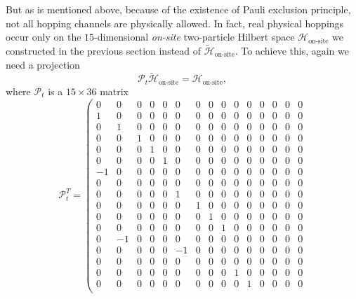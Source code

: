 \documentclass[10pt,nofootinbib]{revtex4}
\begin{document}
			\noindent But as is mentioned above, because of the existence of Pauli exclusion principle, not all hopping channels are physically allowed. In fact, real physical hoppings occur only on the $15$-dimensional \emph{on-site} two-particle Hilbert space $\mathcal{H}_{\text{on-site}}$ we constructed in the previous section instead of $\widetilde{\mathcal{H}}_{\text{on-site}}$. To achieve this, again we need a projection
			\begin{equation}\label{2.2.5}
				\mathcal{P}_t\widetilde{\mathcal{H}}_{\text{on-site}}=\mathcal{H}_{\text{on-site}},
			\end{equation}
			where $\mathcal{P}_t$ is a $15\times36$ matrix
			\begin{equation*}
				\mathcal{P}_t^T=\left(
				\begin{array}{ccccccccccccccc}
					0 & 0 & 0 & 0 & 0 & 0 & 0 & 0 & 0 & 0 & 0 & 0 & 0 & 0 & 0 \\
					1 & 0 & 0 & 0 & 0 & 0 & 0 & 0 & 0 & 0 & 0 & 0 & 0 & 0 & 0 \\
					0 & 1 & 0 & 0 & 0 & 0 & 0 & 0 & 0 & 0 & 0 & 0 & 0 & 0 & 0 \\
					0 & 0 & 1 & 0 & 0 & 0 & 0 & 0 & 0 & 0 & 0 & 0 & 0 & 0 & 0 \\
					0 & 0 & 0 & 1 & 0 & 0 & 0 & 0 & 0 & 0 & 0 & 0 & 0 & 0 & 0 \\
					0 & 0 & 0 & 0 & 1 & 0 & 0 & 0 & 0 & 0 & 0 & 0 & 0 & 0 & 0 \\
					-1 & 0 & 0 & 0 & 0 & 0 & 0 & 0 & 0 & 0 & 0 & 0 & 0 & 0 & 0 \\
					0 & 0 & 0 & 0 & 0 & 0 & 0 & 0 & 0 & 0 & 0 & 0 & 0 & 0 & 0 \\
					0 & 0 & 0 & 0 & 0 & 1 & 0 & 0 & 0 & 0 & 0 & 0 & 0 & 0 & 0 \\
					0 & 0 & 0 & 0 & 0 & 0 & 1 & 0 & 0 & 0 & 0 & 0 & 0 & 0 & 0 \\
					0 & 0 & 0 & 0 & 0 & 0 & 0 & 1 & 0 & 0 & 0 & 0 & 0 & 0 & 0 \\
					0 & 0 & 0 & 0 & 0 & 0 & 0 & 0 & 1 & 0 & 0 & 0 & 0 & 0 & 0 \\
					0 & -1 & 0 & 0 & 0 & 0 & 0 & 0 & 0 & 0 & 0 & 0 & 0 & 0 & 0 \\
					0 & 0 & 0 & 0 & 0 & -1 & 0 & 0 & 0 & 0 & 0 & 0 & 0 & 0 & 0 \\
					0 & 0 & 0 & 0 & 0 & 0 & 0 & 0 & 0 & 0 & 0 & 0 & 0 & 0 & 0 \\
					0 & 0 & 0 & 0 & 0 & 0 & 0 & 0 & 0 & 1 & 0 & 0 & 0 & 0 & 0 \\
					0 & 0 & 0 & 0 & 0 & 0 & 0 & 0 & 0 & 0 & 1 & 0 & 0 & 0 & 0 \\

\end{array}
\end{equation*}
\end{document}
